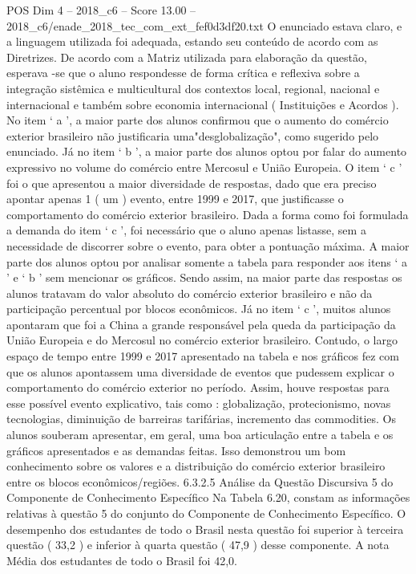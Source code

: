\begin{textsample}{POS Dim 4 – 2018\_c6 – Score 13.00 – 2018\_c6/enade\_2018\_tec\_com\_ext\_fef0d3df20.txt}
O enunciado estava claro, e a linguagem utilizada foi adequada, estando seu conteúdo de acordo com as Diretrizes.
De acordo com a Matriz utilizada para elaboração da questão, esperava -se que o aluno respondesse de forma crítica e reflexiva sobre a integração sistêmica e multicultural dos contextos local, regional, nacional e internacional e também sobre economia internacional ( Instituições e Acordos ).
No item ‘ a ’, a maior parte dos alunos confirmou que o aumento do comércio exterior brasileiro não justificaria uma"desglobalização", como sugerido pelo enunciado.
Já no item ‘ b ’, a maior parte dos alunos optou por falar do aumento expressivo no volume do comércio entre Mercosul e União Europeia.
O item ‘ c ’ foi o que apresentou a maior diversidade de respostas, dado que era preciso apontar apenas 1 ( um ) evento, entre 1999 e 2017, que justificasse o comportamento do comércio exterior brasileiro.
Dada a forma como foi formulada a demanda do item ‘ c ’, foi necessário que o aluno apenas listasse, sem a necessidade de discorrer sobre o evento, para obter a pontuação máxima.
A maior parte dos alunos optou por analisar somente a tabela para responder aos itens ‘ a ’ e ‘ b ’ sem mencionar os gráficos.
Sendo assim, na maior parte das respostas os alunos tratavam do valor absoluto do comércio exterior brasileiro e não da participação percentual por blocos econômicos.
Já no item ‘ c ’, muitos alunos apontaram que foi a China a grande responsável pela queda da participação da União Europeia e do Mercosul no comércio exterior brasileiro.
Contudo, o largo espaço de tempo entre 1999 e 2017 apresentado na tabela e nos gráficos fez com que os alunos apontassem uma diversidade de eventos que pudessem explicar o comportamento do comércio exterior no período.
Assim, houve respostas para esse possível evento explicativo, tais como : globalização, protecionismo, novas tecnologias, diminuição de barreiras tarifárias, incremento das commodities.
Os alunos souberam apresentar, em geral, uma boa articulação entre a tabela e os gráficos apresentados e as demandas feitas.
Isso demonstrou um bom conhecimento sobre os valores e a distribuição do comércio exterior brasileiro entre os blocos econômicos/regiões. 6.3.2.5 Análise da Questão Discursiva 5 do Componente de Conhecimento Específico Na Tabela 6.20, constam as informações relativas à questão 5 do conjunto do Componente de Conhecimento Específico.
O desempenho dos estudantes de todo o Brasil nesta questão foi superior à terceira questão ( 33,2 ) e inferior à quarta questão ( 47,9 ) desse componente.
A nota Média dos estudantes de todo o Brasil foi 42,0.

\end{textsample}
